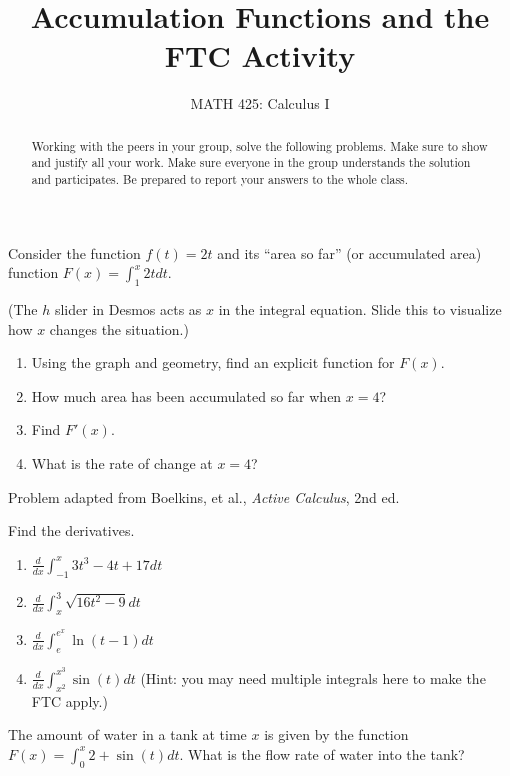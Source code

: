 \documentclass{ximera}
\title{Accumulation Functions and the FTC Activity}
\author{MATH 425: Calculus I}
\begin{document}
\begin{abstract}
   Working with the peers in your group, solve the following problems. Make sure to show and justify all your work. Make sure everyone in the group understands the solution and participates. Be prepared to report your answers to the whole class. 
\end{abstract}
\maketitle


\begin{exercise}
    Consider the function $f(t)=2t$ and its ``area so far'' (or accumulated area) function $F(x)=\int_1^x 2tdt$. 
    \begin{center}
    \end{center}
    (The $h$ slider in Desmos acts as $x$ in the integral equation.  Slide this to visualize how $x$ changes the situation.)\\
    \begin{enumerate}
        \item Using the graph and geometry, find an explicit function for $F(x)$.  
        \item How much area has been accumulated so far when $x=4$?
        \item Find $F'(x)$.
        \item What is the rate of change at $x=4$?
    \end{enumerate}
    Problem adapted from Boelkins, et al., \textit{Active Calculus}, 2nd ed.\\
\end{exercise}

\begin{exercise}
    Find the derivatives.
    \begin{enumerate}
        \item $\frac{d}{dx}\int_{-1}^x 3t^3-4t+17dt$
        \item $\frac{d}{dx}\int_x^3 \sqrt{16t^2-9}dt$
        \item $\frac{d}{dx}\int_e^{e^x} \ln(t-1)dt$
        \item $\frac{d}{dx}\int_{x^2}^{x^3} \sin(t)dt$ (Hint: you may need multiple integrals here to make the FTC apply.)
    \end{enumerate}
\end{exercise}

\begin{exercise}
    The amount of water in a tank at time $x$ is given by the function $F(x)=\int_0^x 2+\sin(t)dt$.  What is the flow rate of water into the tank? 
\end{exercise}
\end{document}
